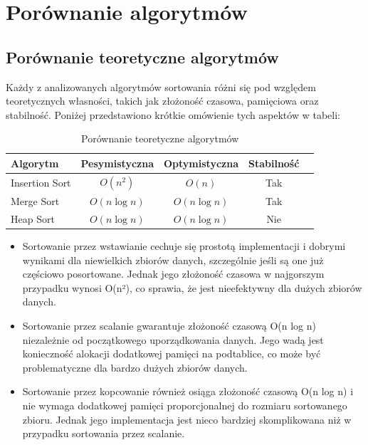 \documentclass{article}
\begin{document}
	
	\section{Porównanie algorytmów}
	
	\subsection{Porównanie teoretyczne algorytmów}
	
	Każdy z analizowanych algorytmów sortowania różni się pod względem teoretycznych własności, takich jak złożoność czasowa, pamięciowa oraz stabilność. Poniżej przedstawiono krótkie omówienie tych aspektów w tabeli:
	
	
	\begin{table}[H]
		\centering
		\begin{tabular}{|l|c|c|c|c|}
			\hline
			\textbf{Algorytm}         & \textbf{Pesymistyczna} & \textbf{Optymistyczna} &\textbf{Stabilność} \\ \hline
			Insertion Sort            & $O(n^2)$              & $O(n)$              	&  Tak               \\ \hline
			Merge Sort                & $O(n \log n)$         & $O(n \log n)$         	& Tak                \\ \hline
			Heap Sort                 & $O(n \log n)$         & $O(n \log n)$			& Nie                \\ \hline
		\end{tabular}
		\caption{Porównanie teoretyczne algorytmów}
		\label{tab:teoretical_comparison}
	\end{table}
	
	
	\begin{itemize}
		\item Sortowanie przez wstawianie cechuje się prostotą implementacji i dobrymi wynikami dla niewielkich zbiorów danych, szczególnie jeśli są one już częściowo posortowane. Jednak jego złożoność czasowa w najgorszym przypadku wynosi O(n²), co sprawia, że jest nieefektywny dla dużych zbiorów danych.
		\item Sortowanie przez scalanie gwarantuje złożoność czasową O(n log n) niezależnie od początkowego uporządkowania danych. Jego wadą jest konieczność alokacji dodatkowej pamięci na podtablice, co może być problematyczne dla bardzo dużych zbiorów danych.
		\item Sortowanie przez kopcowanie również osiąga złożoność czasową O(n log n) i nie wymaga dodatkowej pamięci proporcjonalnej do rozmiaru sortowanego zbioru. Jednak jego implementacja jest nieco bardziej skomplikowana niż w przypadku sortowania przez scalanie. 
	\end{itemize}
	
\end{document}
